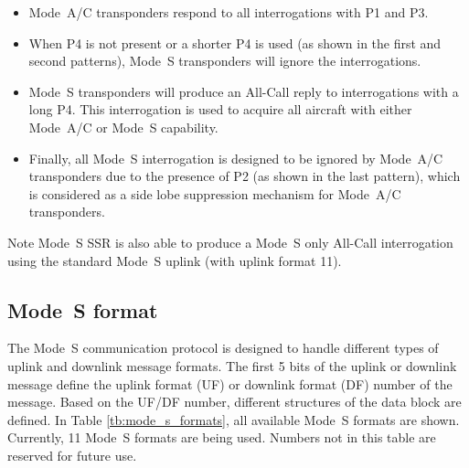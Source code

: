 \begin{itemize}
  \item Mode~A/C transponders respond to all interrogations with P1 and P3.
  \item When P4 is not present or a shorter P4 is used (as shown in the first and second patterns), Mode~S transponders will ignore the interrogations.
  \item Mode~S transponders will produce an All-Call reply to interrogations with a long P4. This interrogation is used to acquire all aircraft with either Mode~A/C or Mode~S capability.
  \item Finally, all Mode~S interrogation is designed to be ignored by Mode~A/C transponders due to the presence of P2 (as shown in the last pattern), which is considered as a side lobe suppression mechanism for Mode~A/C transponders.
\end{itemize}


\begin{notebox}{Note}
  Mode~S SSR is also able to produce a Mode~S only All-Call interrogation using the standard Mode~S uplink (with uplink format 11).
\end{notebox}


\subsection{Mode~S format}

The Mode~S communication protocol is designed to handle different types of uplink and downlink message formats. The first 5 bits of the uplink or downlink message define the uplink format (UF) or downlink format (DF) number of the message. Based on the UF/DF number, different structures of the data block are defined. In Table \ref{tb:mode_s_formats}, all available Mode~S formats are shown. Currently, 11 Mode~S formats are being used. Numbers not in this table are reserved for future use.

